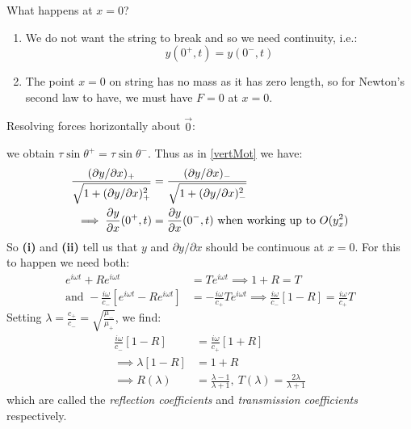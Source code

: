 \documentclass[../main.tex]{subfiles}
\begin{document}
What happens at $x = 0$?
\begin{enumerate}
  \item We do not want the string to break and so we need continuity, i.e.:
    \[
      y(0^{+}, t) = y(0^{-}, t)
    \]
  \item The point $x = 0$ on string has no mass as it has zero length, so for Newton's second law to have, we must have $F = 0$ at $x = 0$.
\end{enumerate}
Resolving forces horizontally about $\vec{0}$:
\begin{center}
\end{center}
we obtain $\tau \sin \theta^{+} = \tau \sin \theta^{-}$.
Thus as in \cref{vertMot} we have:
\begin{align*}
  \frac{(\partial y/\partial x)_{+}}{\sqrt{1 + (\partial y / \partial x)^{2}_{+}}} &=
  \frac{(\partial y/\partial x)_{-}}{\sqrt{1 + (\partial y / \partial x)^{2}_{-}}} \\
  \implies \pderiv{y}{x}(0^{+}, t) &= \pderiv{y}{x}(0^{-}, t) \text{ when working up to } O(y^2_x)
\end{align*}
So \textbf{(i)} and \textbf{(ii)} tell us that $y$ and $\partial y/\partial x$ should be continuous at $x = 0$.
For this to happen we need both:
\begin{align*}
  e^{i \omega t} + R e^{i \omega t} &= T e^{i \omega t} \implies 1 + R = T\\
  \text{and } -\frac{i \omega}{c_{-}}[e^{i\omega t} - R e^{i \omega t}] &= - \frac{i \omega}{c_+} T e^{i \omega t} \implies \frac{i \omega}{c_{-}}[1 - R] = \frac{i \omega}{c_{+}} T
\end{align*}
Setting $\lambda = \frac{c_{+}}{c_{-}} = \sqrt{\frac{\mu_{-}}{\mu_{+}}}$, we find:
\begin{align*}
  \frac{i\omega}{c_{-}}[1 - R] &= \frac{i\omega}{c_{+}}[1 + R] \\
  \implies \lambda [1 - R] &= 1 + R \\
  \implies R(\lambda) &= \frac{\lambda - 1}{\lambda + 1},\ T(\lambda) = \frac{2\lambda}{\lambda + 1}
\end{align*}
which are called the \textit{reflection coefficients} and \textit{transmission coefficients} respectively.
\end{document}
